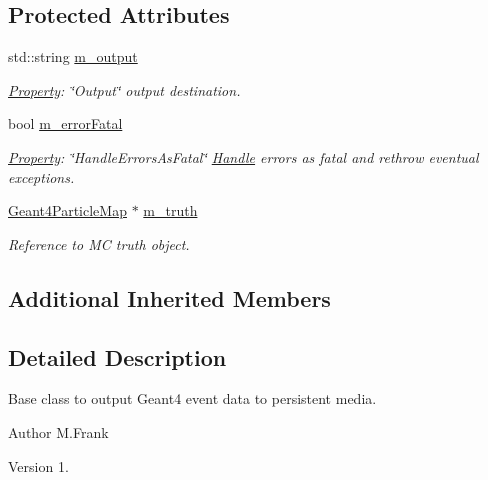 \subsection*{Protected Attributes}
\begin{DoxyCompactItemize}
\item 
std\+::string \hyperlink{class_d_d4hep_1_1_simulation_1_1_geant4_output_action_ac3bd42351cc01a0e259cb5cc9641c6f4}{m\+\_\+output}
\begin{DoxyCompactList}\small\item\em \hyperlink{class_d_d4hep_1_1_property}{Property}\+: \char`\"{}\+Output\char`\"{} output destination. \end{DoxyCompactList}\item 
bool \hyperlink{class_d_d4hep_1_1_simulation_1_1_geant4_output_action_a7d76cce37c53f07c27f41a887fc05dbe}{m\+\_\+error\+Fatal}
\begin{DoxyCompactList}\small\item\em \hyperlink{class_d_d4hep_1_1_property}{Property}\+: \char`\"{}\+Handle\+Errors\+As\+Fatal\char`\"{} \hyperlink{class_d_d4hep_1_1_handle}{Handle} errors as fatal and rethrow eventual exceptions. \end{DoxyCompactList}\item 
\hyperlink{class_d_d4hep_1_1_simulation_1_1_geant4_particle_map}{Geant4\+Particle\+Map} $\ast$ \hyperlink{class_d_d4hep_1_1_simulation_1_1_geant4_output_action_ac2c6fd898ae2b43b9742cd0fb36d31c1}{m\+\_\+truth}
\begin{DoxyCompactList}\small\item\em Reference to MC truth object. \end{DoxyCompactList}\end{DoxyCompactItemize}
\subsection*{Additional Inherited Members}


\subsection{Detailed Description}
Base class to output Geant4 event data to persistent media. 

\begin{DoxyAuthor}{Author}
M.\+Frank 
\end{DoxyAuthor}
\begin{DoxyVersion}{Version}
1. 
\end{DoxyVersion}


